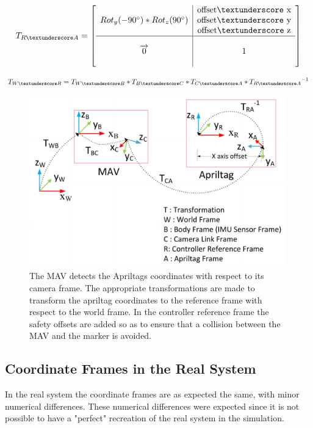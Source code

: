 \begin{equation}
\label{eq:TRA}
\sbox0{$\begin{matrix}\\Rot_y(-90^{\circ}) * Rot_z(90^{\circ})\\ \\\end{matrix}$}
\sbox1{$\begin{matrix}\text{offset\textunderscore x}\\\text{offset\textunderscore y}\\\text{offset\textunderscore z}\end{matrix}$}
%
T_{R\textunderscore A}=\left[
\begin{array}{c|c}
\usebox{0}&\usebox{1}\\
\hline
  \vphantom{\usebox{0}}\makebox[\wd0]{$\overrightarrow{0}$}&\makebox[\wd0]{$1$}
\end{array}
\right]
\end{equation}


\begin{equation}
\label{TWR}
T_{W\textunderscore R} = T_{W\textunderscore B} * T_{B\textunderscore C} * T_{C\textunderscore A} * {T_{R\textunderscore A}}^{-1}
\end{equation}  
 
\begin{figure}
 \centering
 \includegraphics[width=0.99\textwidth]{images/coordinate_frame_representation_v3b.pdf}
 \caption{The MAV detects the Apriltags coordinates with respect to its camera frame. The appropriate transformations are made to transform the apriltag coordinates to the reference frame with respect to the world frame. In the controller reference frame the safety offsets are added so as to ensure that a collision between the MAV and the marker is avoided.}
 \label{pics:mavcoordinateframe}
\end{figure}
  
  
\subsection{Coordinate Frames in the Real System}
\label{sec: CoordinatesinRealSystem}
  
In the real system the coordinate frames are as expected the same, with minor numerical differences. These numerical differences were expected since it is not possible to have a "perfect" recreation of the real system in the simulation. 

